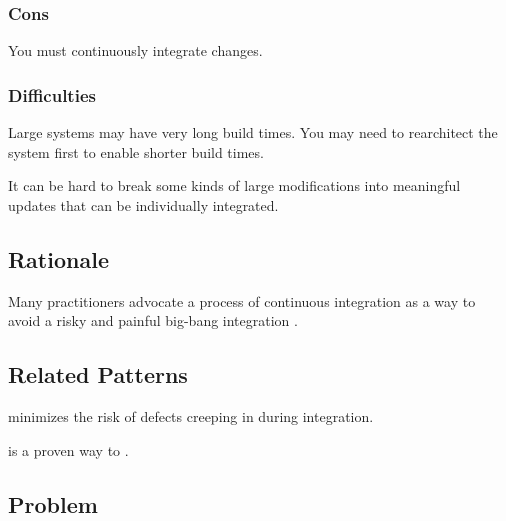 \documentclass[a4paper,10pt,twoside]{book}
\begin{document}
\subsubsection*{Cons}

\begin{bulletlist}
\item You must continuously integrate changes.
\end{bulletlist}

\subsubsection*{Difficulties}

\begin{bulletlist}
\item Large systems may have very long build times. You may need to rearchitect the system first to enable shorter build times.

\item It can be hard to break some kinds of large modifications into meaningful updates that can be individually integrated. 
\end{bulletlist}

\subsection*{Rationale}

Many practitioners advocate a process of continuous integration as a way to avoid a risky and painful big-bang integration \cite{Booc94a}.

\subsection*{Related Patterns}

 minimizes the risk of defects creeping in during integration. 

 \cite{Booc94a} \cite{Beck00a} is a proven way to .




\subsection*{Problem}
\end{document}
